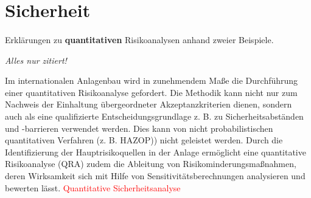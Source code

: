 

\section{Sicherheit}
\paragraph*{\cite{Rath_2009}} Erkl\"arungen zu \textbf{quantitativen} Risikoanalysen anhand zweier Beispiele. \hfill \newline

\textit{Alles nur zitiert!} \hfill \newline

Im internationalen Anlagenbau wird in zunehmendem Ma\ss{}e die Durchf\"uhrung einer quantitativen Risikoanalyse gefordert. Die Methodik kann nicht nur zum Nachweis der Einhaltung \"ubergeordneter Akzeptanzkriterien dienen, sondern auch als eine qualifizierte Entscheidungsgrundlage z. B. zu Sicherheitsabst\"anden und -barrieren verwendet werden. Dies kann von nicht probabilistischen quantitativen Verfahren (z. B. HAZOP)) nicht geleistet werden. Durch die Identifizierung der Hauptrisikoquellen in der Anlage erm\"oglicht eine quantitative Risikoanalyse (QRA) zudem die Ableitung von Risikominderungsma\ss{}nahmen, deren
Wirksamkeit sich mit Hilfe von Sensitivit\"atsberechnungen analysieren und bewerten l\"asst. \textcolor{red}{Quantitative Sicherheitsanalyse}

